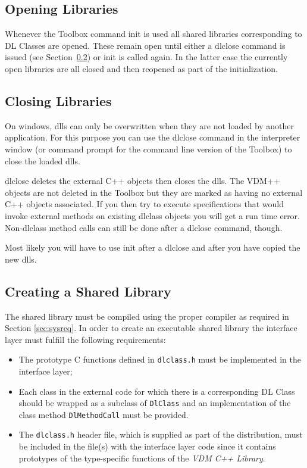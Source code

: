 \documentclass[\pformat,12pt]{article}
\newcommand{\vdmcpplib}{\textit{VDM C++ Library}}
\begin{document}
\subsection{Opening Libraries}

Whenever the Toolbox command \textsf{init} is used all shared
libraries corresponding to DL Classes are opened. These remain open
until either a \textsf{dlclose} command is issued (see
Section~\ref{sec:dlclose}) or \textsf{init} is called again. In the
latter case the currently open libraries are all closed and then
reopened as part of the initialization.

\subsection{Closing Libraries}\label{sec:dlclose}

On windows, dlls can only be overwritten when they are not loaded by another
application. For this purpose you can use the \textsf{dlclose} command
in the interpreter window (or command prompt for the command line
version of the Toolbox) to close the loaded dlls.

\textsf{dlclose} deletes the external C++ objects then closes the
dlls. The VDM++ objects are not deleted in the Toolbox but they are
marked as having no external C++ objects associated. If you then try
to execute specifications that would invoke external methods on
existing dlclass objects you will get a run time error. Non-dlclass
method calls can still be done after a \textsf{dlclose} command, though.

Most likely you will have to use \textsf{init} after a
\textsf{dlclose} and after you have copied the new dlls.



\subsection{Creating a Shared Library}\label{sec:create}

The shared library must be compiled using the proper compiler as
required in Section \ref{sec:sysreq}.  In order to create an
executable shared library the interface layer
must fulfill the following requirements:
\begin{itemize}
\item The prototype C functions defined in \texttt{dlclass.h} must be
implemented in the interface layer;
\item Each class in the external code for which there is a
corresponding DL Class should be wrapped as a subclass of
\texttt{DlClass} and an implementation of the class method
\texttt{DlMethodCall} must be provided.
\item The {\tt dlclass.h} header file, which is supplied as part of the
distribution, must be included in the file(s) with the interface layer
code since  it contains prototypes of the type-specific functions of
the \vdmcpplib. 
\end{itemize}
\end{document}
